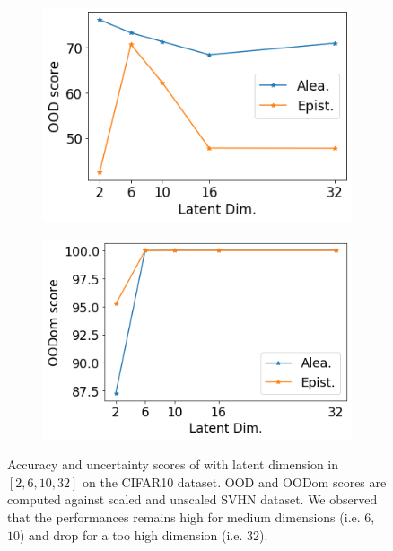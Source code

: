 \begin{figure}[ht]
    \begin{subfigure}[t]{0.33 \textwidth}
        \centering
        \includegraphics[width=1. \textwidth]{sections/006_neurips2020/figures/lat_dim_cifar10_ood_1.png}
    \end{subfigure}%
    \begin{subfigure}[t]{0.33 \textwidth}
        \centering
        \includegraphics[width=1. \textwidth]{sections/006_neurips2020/figures/lat_dim_cifar10_ood_2.png}
    \end{subfigure}%

    \caption{Accuracy and uncertainty scores of \oursacro with latent dimension in $[2, 6, 10, 32]$ on the CIFAR10 dataset. OOD and OODom scores are computed against scaled and unscaled SVHN dataset. We observed that the performances remains high for medium dimensions (i.e. $6$, $10$) and drop for a too high dimension (i.e. $32$).}
    \label{fig:latent_dim_CIFAR10}
\end{figure}
